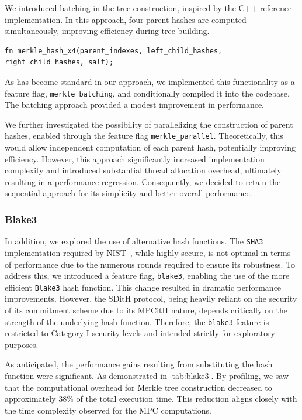 \documentclass[11pt]{report}
\theoremstyle{definition}
\theoremstyle{plain}
\begin{document}
We introduced batching in the tree construction, inspired by the C++ reference implementation. In this approach, four parent hashes are computed simultaneously, improving efficiency during tree-building.

\begin{verbatim}
fn merkle_hash_x4(parent_indexes, left_child_hashes, right_child_hashes, salt);
\end{verbatim}

As has become standard in our approach, we implemented this functionality as a feature flag, \texttt{merkle\_batching}, and conditionally compiled it into the codebase. The batching approach provided a modest improvement in performance.

We further investigated the possibility of parallelizing the construction of parent hashes, enabled through the feature flag \texttt{merkle\_parallel}. Theoretically, this would allow independent computation of each parent hash, potentially improving efficiency. However, this approach significantly increased implementation complexity and introduced substantial thread allocation overhead, ultimately resulting in a performance regression. Consequently, we decided to retain the sequential approach for its simplicity and better overall performance.

\subsubsection*{Blake3}\label{sub:blake3}

In addition, we explored the use of alternative hash functions. The \texttt{SHA3} implementation required by NIST~\cite{nistcall}, while highly secure, is not optimal in terms of performance due to the numerous rounds required to ensure its robustness. To address this, we introduced a feature flag, \texttt{blake3}, enabling the use of the more efficient \texttt{Blake3} hash function. This change resulted in dramatic performance improvements. However, the SDitH protocol, being heavily reliant on the security of its commitment scheme due to its MPCitH nature, depends critically on the strength of the underlying hash function. Therefore, the \texttt{blake3} feature is restricted to Category I security levels and intended strictly for exploratory purposes.

As anticipated, the performance gains resulting from substituting the hash function were significant. As demonstrated in \autoref{tab:blake3}. By profiling, we saw that the computational overhead for Merkle tree construction decreased to approximately $38\%$ of the total execution time. This reduction aligns closely with the time complexity observed for the MPC computations.
\end{document}
